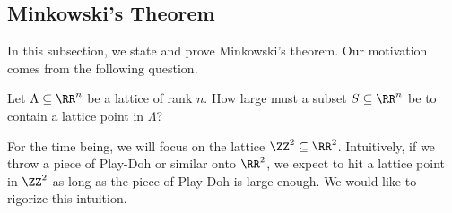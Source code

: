\documentclass[../notes.tex]{subfiles}
\begin{document}
\subsection{Minkowski's Theorem}
In this subsection, we state and prove Minkowski's theorem. Our motivation comes from the following question.
\begin{ques} \label{ques:mink-unrefined}
	Let $\Lambda\subseteq\RR^n$ be a lattice of rank $n$. How large must a subset $S\subseteq\RR^n$ be to contain a lattice point in $\Lambda$?
\end{ques}
For the time being, we will focus on the lattice $\ZZ^2\subseteq\RR^2$. Intuitively, if we throw a piece of Play-Doh or similar onto $\RR^2$, we expect to hit a lattice point in $\ZZ^2$ as long as the piece of Play-Doh is large enough. We would like to rigorize this intuition.
\end{document}

